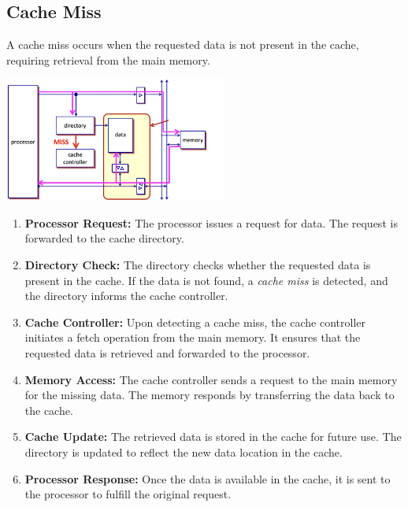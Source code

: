 \subsection{Cache Miss}
A cache miss occurs when the requested data is not present in the cache, requiring retrieval from the main memory. 
\begin{center}
    \includegraphics[width=0.55\textwidth]{chapters/chapter3a/images/miss.png}
\end{center}
\begin{enumerate}
    \item \textbf{Processor Request:} The processor issues a request for data. The request is forwarded to the cache directory.
    \item \textbf{Directory Check:} The directory checks whether the requested data is present in the cache. If the data is not found, a \textit{cache miss} is detected, and the directory informs the cache controller.
    \item \textbf{Cache Controller:} Upon detecting a cache miss, the cache controller initiates a fetch operation from the main memory. It ensures that the requested data is retrieved and forwarded to the processor.
    \item \textbf{Memory Access:} The cache controller sends a request to the main memory for the missing data. The memory responds by transferring the data back to the cache.
    \item \textbf{Cache Update:} The retrieved data is stored in the cache for future use. The directory is updated to reflect the new data location in the cache.
    \item \textbf{Processor Response:} Once the data is available in the cache, it is sent to the processor to fulfill the original request.
\end{enumerate}

